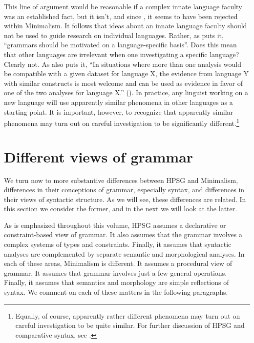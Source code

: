 \documentclass[output=paper]{langsci/langscibook}
\begin{document}
This line of argument would be reasonable if a complex innate language
faculty was an established fact, but it isn't, and since \citet*{HCF2002a}, it seems to have been
rejected within Minimalism.  It follows that ideas about an innate language faculty should not be
used to guide research on individual languages. Rather, as \citet[25]{MuellerCoreGram} puts it,
``grammars should be motivated on a language-specific basis''. Does this mean that other languages are
irrelevant when one investigating a specific language? Clearly not. As 
also puts it, ``In situations where more than one analysis would be compatible with a given dataset
for language X, the evidence from language Y with similar constructs is most welcome and can be used
as evidence in favor of one of the two analyses for language X.'' (\citeyear[43]{MuellerCoreGram}). In
practice, any linguist working on a new language will use apparently similar phenomena in other
languages as a starting point. It is important, however, to recognize that apparently similar
phenomena may turn out on careful investigation to be significantly different.\footnote{%
  Equally, of course, apparently rather different phenomena may turn out on careful investigation to
  be quite similar. For further discussion of HPSG and comparative syntax, see .%
} 

\section{Different views of grammar}
\label{sec:min-views-grammar}

We turn now to more substantive differences between HPSG and Minimalism, differences in their conceptions of grammar, especially syntax, and differences in their views of syntactic structure. As we will see, these differences are related. In this section we consider the former, and in the next we will look at the latter.

As is emphasized throughout this volume, HPSG assumes a declarative or constraint-based view of
grammar. It also assumes that the grammar involves a complex systems of types and
constraints. Finally, it assumes that syntactic analyses are complemented by separate semantic and
morphological analyses. In each of these areas, Minimalism is different. It assumes a procedural
view of grammar. It assumes that grammar involves just a few general operations. Finally, it assumes
that semantics and morphology are simple reflections of syntax. We comment on each of these matters
in the following paragraphs. 
\end{document}
